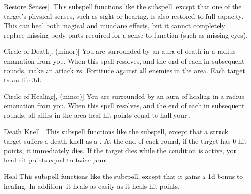 \begin{ability}[\nth{2}]{Restore Senses}[]
This subspell functions like the  subspell, except that one of the target's physical senses, such as sight or hearing, is also restored to full capacity.
This can heal both magical and mundane effects, but it cannot completely replace missing body parts required for a sense to function (such as missing eyes).
\end{ability}
\vspace{0.25em}


\begin{ability}[\nth{3}]{Circle of Death}[,  (minor)]
You are surrounded by an aura of death in a \areamed radius emanation from you.
When this spell resolves, and the end of each  in subsequent rounds, make an attack vs. Fortitude against all enemies in the area.
\hit Each target takes life  \minus3d.
\end{ability}
\vspace{0.25em}


\begin{ability}[\nth{3}]{Circle of Healing}[,  (minor)]
You are surrounded by an aura of healing in a \areamed radius emanation from you.
When this spell resolves, and the end of each  in subsequent rounds, all allies in the area heal hit points equal to half your .
\end{ability}
\vspace{0.25em}


\begin{ability}[\nth{3}]{Death Knell}[]
This subspell functions like the  subspell, except that a struck target suffers a death knell as a .
At the end of each round, if the target has 0 hit points, it immediately dies.
If the target dies while the condition is active, you heal hit points equal to twice your .
\end{ability}
\vspace{0.25em}


\begin{ability}[\nth{4}]{Heal}
This subspell functions like the  subspell, except that it gains a \plus1d bonus to healing.
In addition, it heals  as easily as it heals hit points.
\end{ability}
\vspace{0.25em}

